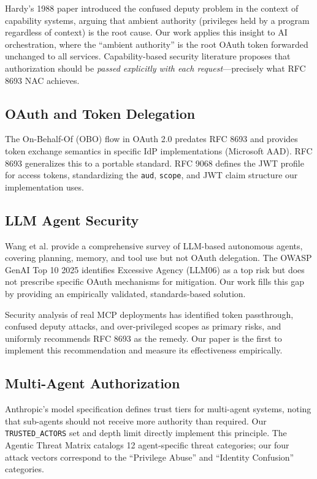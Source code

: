 \documentclass[journal]{IEEEtran}
\begin{document}
Hardy's 1988 paper \cite{hardy1988} introduced the confused deputy problem in the context of capability systems, arguing that ambient authority (privileges held by a program regardless of context) is the root cause. Our work applies this insight to AI orchestration, where the ``ambient authority'' is the root OAuth token forwarded unchanged to all services. Capability-based security literature \cite{miller2003} proposes that authorization should be \textit{passed explicitly with each request}—precisely what RFC 8693 NAC achieves.

\subsection{OAuth and Token Delegation}

The On-Behalf-Of (OBO) flow in OAuth 2.0 \cite{rfc6749} predates RFC 8693 and provides token exchange semantics in specific IdP implementations (Microsoft AAD). RFC 8693 \cite{rfc8693} generalizes this to a portable standard. RFC 9068 \cite{rfc9068} defines the JWT profile for access tokens, standardizing the \texttt{aud}, \texttt{scope}, and JWT claim structure our implementation uses.

\subsection{LLM Agent Security}

Wang et al. \cite{wang2024survey} provide a comprehensive survey of LLM-based autonomous agents, covering planning, memory, and tool use but not OAuth delegation. The OWASP GenAI Top 10 2025 \cite{owasp_genai} identifies Excessive Agency (LLM06) as a top risk but does not prescribe specific OAuth mechanisms for mitigation. Our work fills this gap by providing an empirically validated, standards-based solution.

Security analysis of real MCP deployments \cite{checkmarx_mcp, mcp_sec_medium_2025, cosai_mcp, fluidattacks_mcp} has identified token passthrough, confused deputy attacks, and over-privileged scopes as primary risks, and uniformly recommends RFC 8693 as the remedy. Our paper is the first to implement this recommendation and measure its effectiveness empirically.

\subsection{Multi-Agent Authorization}

Anthropic's model specification \cite{anthropic_model_spec} defines trust tiers for multi-agent systems, noting that sub-agents should not receive more authority than required. Our \texttt{TRUSTED\_ACTORS} set and depth limit directly implement this principle. The Agentic Threat Matrix \cite{agentic_threat_matrix} catalogs 12 agent-specific threat categories; our four attack vectors correspond to the ``Privilege Abuse'' and ``Identity Confusion'' categories.
\end{document}
